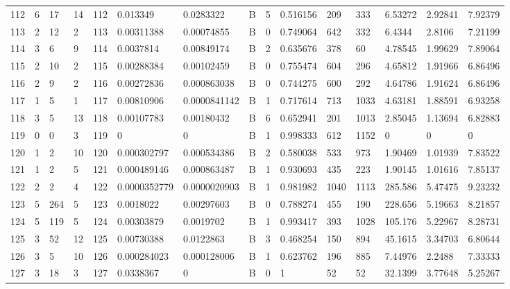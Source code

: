 \begin{latin}
\begin{longtable}{lllllllllllllll}
	112 & 6  & 17  & 14 & 112 & 0.013349       & 0.0283322      & B & 5  & 0.516156 & 209  & 333  & 6.53272 & 2.92841 & 7.92379 \\
	113 & 2  & 12  & 2  & 113 & 0.00311388     & 0.00074855     & B & 0  & 0.749064 & 642  & 332  & 6.4344  & 2.8106  & 7.21199 \\
	114 & 3  & 6   & 9  & 114 & 0.0037814      & 0.00849174     & B & 2  & 0.635676 & 378  & 60   & 4.78545 & 1.99629 & 7.89064 \\
	115 & 2  & 10  & 2  & 115 & 0.00288384     & 0.00102459     & B & 0  & 0.755474 & 604  & 296  & 4.65812 & 1.91966 & 6.86496 \\
	116 & 2  & 9   & 2  & 116 & 0.00272836     & 0.000863038    & B & 0  & 0.744275 & 600  & 292  & 4.64786 & 1.91624 & 6.86496 \\
	117 & 1  & 5   & 1  & 117 & 0.00810906     & 0.0000841142   & B & 1  & 0.717614 & 713  & 1033 & 4.63181 & 1.88591 & 6.93258 \\
	118 & 3  & 5   & 13 & 118 & 0.00107783     & 0.00180432     & B & 6  & 0.652941 & 201  & 1013 & 2.85045 & 1.13694 & 6.82883 \\
	119 & 0  & 0   & 3  & 119 & 0              & 0              & B & 1  & 0.998333 & 612  & 1152 & 0       & 0       & 0       \\
	120 & 1  & 2   & 10 & 120 & 0.000302797    & 0.000534386    & B & 2  & 0.580038 & 533  & 973  & 1.90469 & 1.01939 & 7.83522 \\
	121 & 1  & 2   & 5  & 121 & 0.000489146    & 0.000863487    & B & 1  & 0.930693 & 435  & 223  & 1.90145 & 1.01616 & 7.85137 \\
	122 & 2  & 2   & 4  & 122 & 0.0000352779   & 0.0000020903   & B & 1  & 0.981982 & 1040 & 1113 & 285.586 & 5.47475 & 9.23232 \\
	123 & 5  & 264 & 5  & 123 & 0.0018022      & 0.00297603     & B & 0  & 0.788274 & 455  & 190  & 228.656 & 5.19663 & 8.21857 \\
	124 & 5  & 119 & 5  & 124 & 0.00303879     & 0.0019702      & B & 1  & 0.993417 & 393  & 1028 & 105.176 & 5.22967 & 8.28731 \\
	125 & 3  & 52  & 12 & 125 & 0.00730388     & 0.0122863      & B & 3  & 0.468254 & 150  & 894  & 45.1615 & 3.34703 & 6.80644 \\
	126 & 3  & 5   & 10 & 126 & 0.000284023    & 0.000128006    & B & 1  & 0.623762 & 196  & 885  & 7.44976 & 2.2488  & 7.33333 \\
	127 & 3  & 18  & 3  & 127 & 0.0338367      & 0              & B & 0  & 1        & 52   & 52   & 32.1399 & 3.77648 & 5.25267 \\

\end{longtable}
\end{latin}
